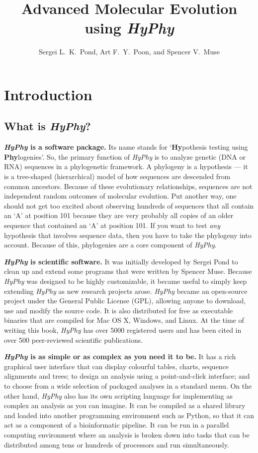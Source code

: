 \documentclass[12pt]{book}
\newcommand{\hyphy}{\textit{HyPhy }}
\begin{document}
\title{Advanced Molecular Evolution using {\it HyPhy}}
\author{Sergei L.~K.~Pond, Art F.~Y.~Poon, and Spencer V.~Muse}
\date{}
\maketitle

\chapter {Introduction}

\section {What is {\it HyPhy}?}

\textbf{\hyphy is a software package.}  Its name stands for `{\bf Hy}pothesis testing using {\bf Phy}logenies'.  So, the primary function of \hyphy is to analyze genetic (DNA or RNA) sequences in a phylogenetic framework.  A phylogeny is a hypothesis --- it is a tree-shaped (hierarchical) model of how sequences are descended from common ancestors.  Because of these evolutionary relationships, sequences are not independent random outcomes of molecular evolution.  Put another way, one should not get too excited about observing hundreds of sequences that all contain an `A' at position 101 because they are very probably all copies of an older sequence that contained an `A' at position 101.  If you want to test {\it any} hypothesis that involves sequence data, then you have to take the phylogeny into account.  Because of this, phylogenies are a core component of {\it HyPhy}.

\textbf{\hyphy is scientific software.}  It was initially developed by Sergei Pond to clean up and extend some programs that were written by Spencer Muse.  Because \hyphy was designed to be highly customizable, it became useful to simply keep extending \hyphy as new research projects arose.  \hyphy became an open-source project under the General Public License (GPL), allowing anyone to download, use and modify the source code.  It is also distributed for free as executable binaries that are compiled for Mac OS X, Windows, and Linux.  At the time of writing this book, \hyphy has over 5000 registered users and has been cited in over 500 peer-reviewed scientific publications.  

\textbf{\hyphy is as simple or as complex as you need it to be.}  It has a rich graphical user interface that can display colourful tables, charts, sequence alignments and trees; to design an analysis using a point-and-click interface; and to choose from a wide selection of packaged analyses in a standard menu.  On the other hand, \hyphy also has its own scripting language for implementing as complex an analysis as you can imagine.  It can be compiled as a shared library and loaded into another programming environment such as Python, so that it can act as a component of a bioinformatic pipeline.  It can be run in a parallel computing environment where an analysis is broken down into tasks that can be distributed among tens or hundreds of processors and run simultaneously.  
\end{document}
